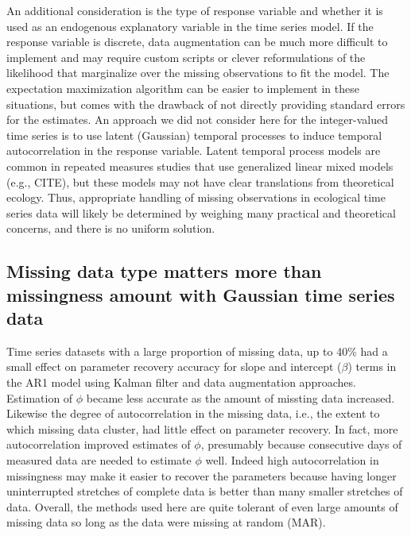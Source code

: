 


An additional consideration is the type of response variable and whether it is used as an endogenous explanatory variable in the time series model. If the response variable is discrete, data augmentation can be much more difficult to implement and may require custom scripts or clever reformulations of the likelihood that marginalize over the missing observations to fit the model. The expectation maximization algorithm can be easier to implement in these situations, but comes with the drawback of not directly providing standard errors for the estimates. An approach we did not consider here for the integer-valued time series is to use latent (Gaussian) temporal processes to induce temporal autocorrelation in the response variable. Latent temporal process models are common in repeated measures studies that use generalized linear mixed models (e.g., CITE), but these models may not have clear translations from theoretical ecology. Thus, appropriate handling of missing observations in ecological time series data will likely be determined by weighing many practical and theoretical concerns, and there is no uniform solution.


\subsection*{Missing data type matters more than missingness amount with Gaussian time series data}        

Time series datasets with a large proportion of missing data, up to 40\% had a small effect on parameter recovery accuracy for slope and intercept ($\beta$) terms in the AR1 model using Kalman filter and data augmentation approaches. Estimation of $\phi$ became less accurate as the amount of missting data increased.  Likewise the degree of autocorrelation in the missing data, i.e., the extent to which missing data cluster, had little effect on parameter recovery. In fact, more autocorrelation improved estimates of $\phi$, presumably because consecutive days of measured data are needed to estimate  $\phi$ well.  Indeed high autocorrelation in missingness may make it easier to recover the parameters because having longer uninterrupted stretches of complete data is better than many smaller stretches of data. Overall, the methods used here are quite tolerant of even large amounts of missing  data so long as the data were missing at random (MAR).

